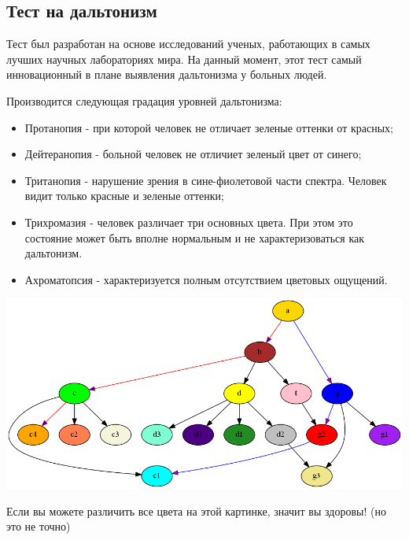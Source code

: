 \documentclass[a4paper,12pt]{report}
\begin{document}
	
	\begin{center}
		\section*{Тест на дальтонизм}
	\end{center}

	Тест был разработан на основе исследований ученых, работающих в самых лучших научных лабораториях мира. На данный момент, этот тест самый инновационный в плане выявления дальтонизма у больных людей. 
	
	Производится следующая градация уровней дальтонизма:
	\begin{itemize}
		\item Протанопия - при которой человек не отличает зеленые оттенки от красных;
		\item Дейтеранопия - больной человек не отличиет зеленый цвет от синего;
		\item Тританопия - нарушение зрения в сине-фиолетовой части спектра. Человек видит только красные и зеленые оттенки;
		\item Трихромазия - человек различает три основных цвета. При этом это состояние может быть вполне нормальным и не характеризоваться как дальтонизм.
		\item Ахроматопсия - характеризуется полным отсутствием цветовых ощущений.
	\end{itemize}

	\includegraphics[scale=0.45]{ex2.png}


	Если вы можете различить все цвета на этой картинке, значит вы здоровы! (но это не точно)
\end{document}
